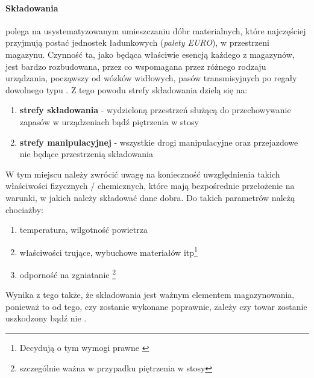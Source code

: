 		\paragraph{Składowania} polega na usystematyzowanym umieszczaniu dóbr materialnych, które najczęściej przyjmują
		postać jednostek ładunkowych (\textit{palety EURO}), w przestrzeni magazynu. Czynność ta, jako będąca właściwie
		esencją każdego z magazynów, jest bardzo rozbudowana, przez co wspomagana przez różnego rodzaju urządzania, począwszy
		od wózków widłowych, pasów transmisyjnych po regały dowolnego typu . Z tego powodu strefy składowania dzielą się na:
		\begin{enumerate}
			\item \textbf{strefy składowania} - wydzieloną przestrzeń służącą do 
			przechowywanie zapasów w urządzeniach bądź piętrzenia w stosy
			\item \textbf{strefy manipulacyjnej} - wszystkie drogi manipulacyjne 
			oraz przejazdowe nie będące przestrzenią składowania
		\end{enumerate}	
		W tym miejscu należy zwrócić uwagę na konieczność uwzględnienia takich właściwości fizycznych / chemicznych, które
		mają bezpośrednie przełożenie na warunki, w jakich należy składować dane dobra. Do takich parametrów należą
		chociażby:
		\begin{enumerate}
			\item temperatura, wilgotność powietrza
			\item właściwości trujące, wybuchowe materiałów itp\footnote{Decydują o tym wymogi prawne \cite{ustawa_flamableMaterials}}
			\item odporność na zgniatanie \footnote{szczególnie ważna w przypadku piętrzenia w stosy}
		\end{enumerate}			
		Wynika z tego także, że składowania jest ważnym elementem magazynowania, ponieważ to od tego, czy zostanie
		wykonane poprawnie, zależy czy towar zostanie uszkodzony bądź nie \cite{EWSS}.
